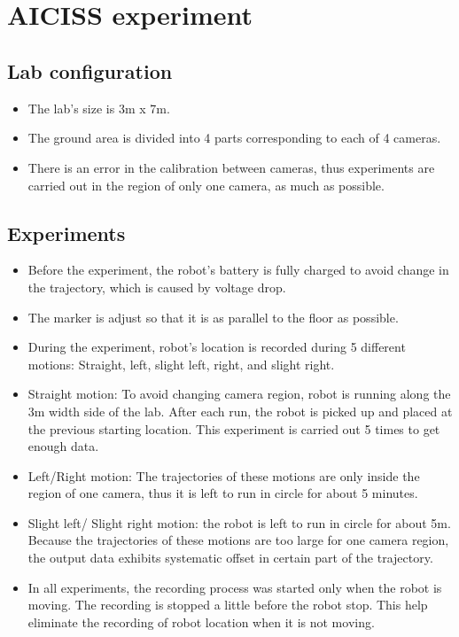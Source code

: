 \documentclass[paper=a4, fontsize=11pt]{scrartcl} %
\title{\hmwkClass \\
       \hmwkTitle}
\author{\hmwkAuthorFullName}
\date{\hmwkDueDate}
\begin{document}
    \maketitle
    \thispagestyle{fancy} %

\section{AICISS experiment}
    \subsection{Lab configuration}
        \begin{itemize}
            \item The lab's size is 3m x 7m.
            \item The ground area is divided into 4 parts corresponding to each of 4 cameras.
            \item There is an error in the calibration between cameras, thus experiments are carried out in the region of only one camera, as much as possible.
        \end{itemize}

    \subsection{Experiments}
        \begin{itemize}
            \item Before the experiment, the robot's battery is fully charged to avoid change in the trajectory, which is caused by voltage drop.
            \item The marker is adjust so that it is as parallel to the floor as possible.
            \item During the experiment, robot's location is recorded during 5 different motions: Straight, left, slight left, right, and slight right.
            \item Straight motion: To avoid changing camera region, robot is running along the 3m width side of the lab. After each run, the robot is picked up and placed at the previous starting location. This experiment is carried out 5 times to get enough data.
            \item Left/Right motion: The trajectories of these motions are only inside the region of one camera, thus it is left to run in circle for about 5 minutes.
            \item Slight left/ Slight right motion: the robot is left to run in circle for about 5m. Because the trajectories of these motions are too large for one camera region, the output data exhibits systematic offset in certain part of the trajectory.
            \item In all experiments, the recording process was started only when the robot is moving. The recording is stopped a little before the robot stop. This help eliminate the recording of robot location when it is not moving.  
        \end{itemize}
\end{document}
